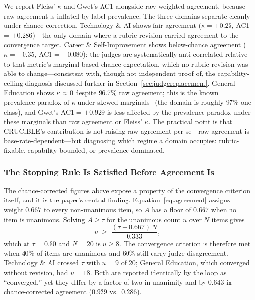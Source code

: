 \documentclass[11pt]{article}
\begin{document}
We report Fleiss' $\kappa$ and Gwet's AC1 alongside raw weighted agreement, because raw
agreement is inflated by label prevalence. The three domains separate cleanly under
chance correction. Technology \& AI shows fair agreement ($\kappa = +0.25$, AC1 = $+0.286$)---the
only domain where a rubric revision carried agreement to the convergence target. Career \&
Self-Improvement shows below-chance agreement ($\kappa = -0.35$, AC1 = $-0.080$): the
judges are systematically anti-correlated relative to that metric's marginal-based chance
expectation, which no rubric revision was able to change---consistent with, though not
independent proof of, the capability-ceiling diagnosis discussed further in
Section~\ref{sec:judgereplacement}. General Education shows $\kappa \approx 0$ despite 96.7\%
raw agreement; this is the known prevalence paradox of $\kappa$ under skewed marginals~\cite{gwet2008} (the
domain is roughly 97\% one class), and Gwet's AC1 = $+0.929$ is less affected by the
prevalence paradox under these marginals than raw agreement or Fleiss' $\kappa$. The practical point
is that CRUCIBLE's contribution is not raising raw agreement per se---raw agreement is
base-rate-dependent---but diagnosing which regime a domain occupies: rubric-fixable,
capability-bounded, or prevalence-dominated.

\subsubsection{The Stopping Rule Is Satisfied Before Agreement Is}
\label{sec:metricfloor}

The chance-corrected figures above expose a property of the convergence
criterion itself, and it is the paper's central finding. Equation~\ref{eq:agreement}
assigns weight $0.667$ to every non-unanimous item, so $A$ has a floor of
$0.667$ when no item is unanimous. Solving $A \geq \tau$ for the unanimous
count $u$ over $N$ items gives
%
\begin{equation}
\label{eq:floor}
u \;\geq\; \frac{(\tau - 0.667)\,N}{0.333},
\end{equation}
%
which at $\tau = 0.80$ and $N = 20$ is $u \geq 8$. The convergence
criterion is therefore met when 40\% of items are unanimous and 60\% still
carry judge disagreement. Technology \& AI crossed $\tau$ with $u = 9$ of
20; General Education, which converged without revision, had $u = 18$.
Both are reported identically by the loop as ``converged,'' yet they
differ by a factor of two in unanimity and by $0.643$ in chance-corrected
agreement ($0.929$ vs.\ $0.286$).
\end{document}

